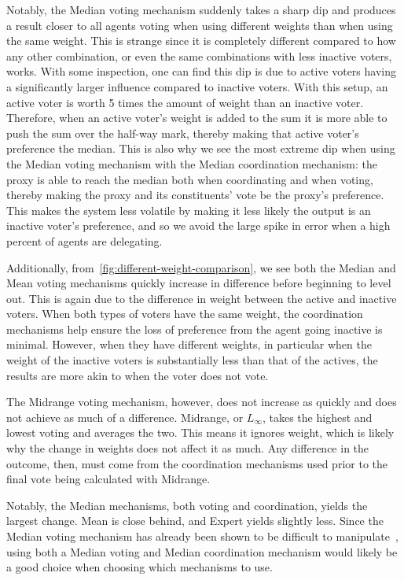 Notably, the Median voting mechanism suddenly takes a sharp dip and produces a result
closer to all agents voting when using different weights than when using the same
weight.
This is strange since it is completely different compared to how any other
combination, or even the same combinations with less inactive voters, works.
With some inspection, one can find this dip is due to active voters having a
significantly larger influence compared to inactive voters.
With this setup, an active voter is worth 5 times the amount of weight than an
inactive voter.
Therefore, when an active voter's weight is added to the sum it is more able to push
the sum over the half-way mark, thereby making that active voter's preference the
median.
This is also why we see the most extreme dip when using the Median voting mechanism
with the Median coordination mechanism: the proxy is able to reach the median both when
coordinating and when voting, thereby making the proxy and its constituents' vote be the
proxy's preference.
This makes the system less volatile by making it less likely the output is an inactive
voter's preference, and so we avoid the large spike in error when a high percent of
agents are delegating.

Additionally, from~\autoref{fig:different-weight-comparison}, we see both the Median
and Mean voting mechanisms quickly increase
in difference before beginning to level out.
This is again due to the difference in weight between the active and inactive voters.
When both types of voters have the same weight, the coordination mechanisms help
ensure the loss of preference from the agent going inactive is minimal.
However, when they have different weights, in particular when the weight of the
inactive voters is substantially less than that of the actives, the results are more
akin to when the voter does not vote.

The Midrange voting mechanism, however, does not increase as quickly and does not
achieve as much of a difference.
Midrange, or $L_{\infty}$, takes the highest and lowest voting and averages the two.
This means it ignores weight, which is likely why the change in weights does not
affect it as much.
Any difference in the outcome, then, must come from the coordination mechanisms used
prior to the final vote being calculated with Midrange.

Notably, the Median mechanisms, both voting and coordination, yields the largest
change.
Mean is close behind, and Expert yields slightly less.
Since the Median voting mechanism has already been shown to be difficult to
manipulate~\cite{Moulin1980}, using both a Median voting and Median coordination
mechanism would likely be a good choice when choosing which mechanisms to use.

